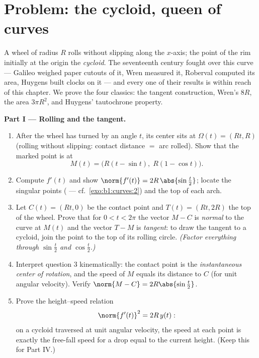 \section{Problem: the cycloid, queen of curves}

\begin{problem}\label{pb:b1:curves:1}
A wheel of radius $R$ rolls without slipping along the $x$-axis;
the point of the rim initially at the origin  the
\emph{cycloid}. The seventeenth century fought over this curve
--- Galileo weighed paper cutouts of it, Wren measured it,
Roberval computed its area, Huygens built clocks on it --- and
every one of their results is within reach of this chapter. We
prove the four classics: the tangent construction, Wren's 
$8R$, the area $3\pi R^2$, and Huygens' tautochrone
property.

\medskip
\noindent\textbf{Part I --- Rolling and the tangent.}
\begin{enumerate}
  \item After the wheel has turned by an angle $t$, its center
        sits at $\Omega(t) = (Rt, R)$ (rolling without slipping:
        contact distance $=$ arc rolled). Show that the marked
        point is at
        \[
        M(t) = \bigl(R(t - \sin t),\; R(1 - \cos t)\bigr).
        \]
  \item Compute $f'(t)$ and show $\norm{f'(t)} =
        2R\,\abs{\sin\frac t2}$; locate the singular points
        ( --- cf.\ \cref{exo:b1:curves:2}) and the top of
        each arch.
  \item Let $C(t) = (Rt, 0)$ be the contact point and $T(t) =
        (Rt, 2R)$ the top of the wheel. Prove that for $0 < t <
        2\pi$ the vector $M - C$ is \emph{normal} to the curve at
        $M(t)$ and the vector $T - M$ is \emph{tangent}: to draw
        the tangent to a cycloid, join the point to the top of
        its rolling circle. \emph{(Factor everything through
        $\sin\frac t2$ and $\cos\frac t2$.)}
  \item Interpret question 3 kinematically: the contact point is
        the \emph{instantaneous center of rotation}, and the
        speed of $M$ equals its distance to $C$ (for unit angular
        velocity). Verify $\norm{M - C} = 2R\abs{\sin\frac t2}$.
  \item Prove the height--speed relation
        \[
        \norm{f'(t)}^2 = 2R\,y(t) :
        \]
        on a cycloid traversed at unit angular velocity, the
        speed at each point is exactly the free-fall speed for a
        drop equal to the current height. (Keep this for
        Part IV.)
\end{enumerate}


\end{problem}
